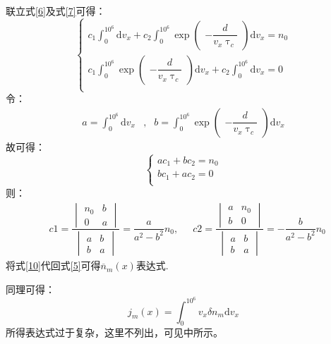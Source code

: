 \documentclass{article}
\begin{document}
联立式\eqref{6}及式\eqref{7}可得：
\begin{equation}\label{8}
\left\{
\begin{aligned}
c_1\int_0^{10^6}\mathrm{d}v_x+c_2\int_0^{10^6}\exp\begin{pmatrix}-\dfrac{d}{v_x\uptau_c}\end{pmatrix}\mathrm{d}v_x=n_0\\
c_1\int_0^{10^6}\exp\begin{pmatrix}-\dfrac{d}{v_x\uptau_c}\end{pmatrix}\mathrm{d}v_x+c_2\int_0^{10^6}\mathrm{d}v_x=0\\
\end{aligned}\right.
\end{equation}
令：
\[
\begin{aligned}
	a=\int_0^{10^6}\mathrm{d}v_x&\text{,}
	&b=\int_0^{10^6}\exp\begin{pmatrix}-\dfrac{d}{v_x\uptau_c}\end{pmatrix}\mathrm{d}v_x
\end{aligned}
\]
故可得：
\begin{equation}\label{9}
\left\{
\begin{aligned}
ac_1+bc_2=n_0\\
bc_1+ac_2=0\\
\end{aligned}\right.
\end{equation}
则：
\begin{equation}\label{10}
\begin{aligned}
	&c1=\dfrac{\begin{vmatrix}n_0&b\\0&a\end{vmatrix}}{\begin{vmatrix}a&b\\b&a\end{vmatrix}}=\dfrac{a}{a^2-b^2}n_0\text{,}&\text{}
	&c2=\dfrac{\begin{vmatrix}a&n_0\\b&0\end{vmatrix}}{\begin{vmatrix}a&b\\b&a\end{vmatrix}}=-\dfrac{b}{a^2-b^2}n_0
\end{aligned}
\end{equation}
将式\eqref{10}代回式\eqref{5}可得$\overline{n}_m(x)$表达式.

同理可得：
\begin{equation}\label{11}
j_m(x)=\int_0^{10^6}v_x\delta n_m\mathrm{d}v_x
\end{equation}
所得表达式过于复杂，这里不列出，可见\href{run:./Ultimate.nb}{\color{hyperreference}{Mathematica}}中所示。
\end{document}
